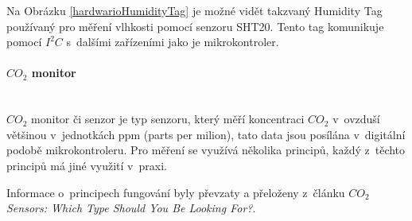 Na Obrázku \ref{hardwarioHumidityTag} je možné vidět takzvaný Humidity Tag používaný pro měření vlhkosti pomocí senzoru SHT20. Tento tag komunikuje pomocí $I^2C$ s~dalšími zařízeními jako je mikrokontroler.

\paragraph*{$CO_2$ monitor}\mbox{} \\
$CO_2$ monitor či senzor je typ senzoru, který měří koncentraci $CO_2$ v~ovzduší většinou v~jednotkách ppm (parts per milion), tato data jsou posílána v~digitální podobě mikrokontroleru. Pro měření se využívá několika principů, každý z~těchto principů má jiné využití v~praxi.

Informace o~principech fungování byly převzaty a přeloženy z~článku \emph{$CO_2$ Sensors: Which Type Should You Be Looking For?}\cite{co2-sensor-description}.

